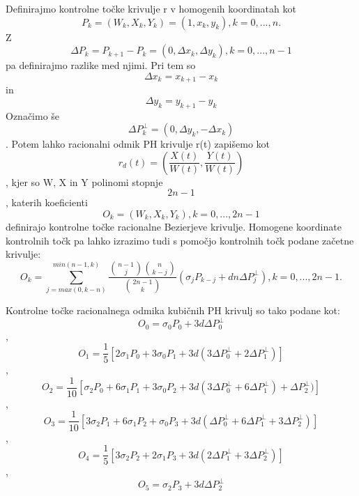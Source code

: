 \documentclass[12pt]{article}
\begin{document}
Definirajmo kontrolne točke krivulje r v homogenih koordinatah kot
$$ P_k = (W_k, X_k, Y_k) = (1, x_k, y_k), k = 0, ..., n.$$
Z $$\Delta P_k = P_{k+1}-P_k = (0, \Delta x_k, \Delta y_k), k = 0, ..., n-1$$ 
pa definirajmo razlike med njimi. Pri tem so $$\Delta x_k = x_{k+1} - x_k$$ in $$\Delta y_k = y_{k+1} - y_k$$
Označimo še $$ \Delta P_k^{\perp} = (0, \Delta y_k, - \Delta x_k)$$. Potem lahko
racionalni odmik PH krivulje r(t) zapišemo kot
$$ r_d(t) = (\frac{X(t)}{W(t)}, \frac{Y(t)}{W(t)})$$,
kjer so W, X in Y polinomi stopnje $$2n -1$$, katerih koeficienti 
$$ O_k = (W_k, X_k, Y_k), k = 0, ..., 2n-1$$
definirajo kontrolne točke racionalne Bezierjeve krivulje. 
Homogene koordinate kontrolnih točk pa lahko izrazimo tudi s pomočjo kontrolnih točk podane začetne krivulje:
$$ O_k = \sum_{j=max(0,k-n)}^{min(n-1,k)}{\frac{\binom{n-1}{j}\binom{n}{k-j}}{\binom{2n-1}{k}}(\sigma_j P_{k-j}+d n \Delta P^{\perp}_{j})}, k = 0, ..., 2n-1.$$

Kontrolne točke racionalnega odmika kubičnih PH krivulj so tako podane kot:
$$ O_0 = \sigma_0 P_0 + 3 d \Delta P_0^{\perp}$$,
$$ O_1 = \frac{1}{5} [2 \sigma_1 P_0 + 3\sigma_0 P_1 + 3 d (3 \Delta P_0^{\perp} + 2 \Delta P_1^{\perp})]$$,
$$ O_2 = \frac{1}{10} [\sigma_2 P_0 + 6\sigma_1 P_1 + 3\sigma_0 P_2 + 3 d (3 \Delta P_0^{\perp} + 6 \Delta P_1^{\perp}) + \Delta P_2^{\perp})]$$,
$$ O_3 = \frac{1}{10} [3\sigma_2 P_1 + 6\sigma_1 P_2 + \sigma_0 P_3 + 3 d (\Delta P_0^{\perp} + 6 \Delta P_1^{\perp} + 3 \Delta P_2^{\perp})]$$,
$$ O_4 = \frac{1}{5} [3\sigma_2 P_2 + 2\sigma_1 P_3 + 3 d (2\Delta P_1^{\perp} + 3 \Delta P_2^{\perp})]$$,
$$ O_5 = \sigma_2 P_3 + 3 d \Delta P_2^{\perp}$$


\end{document}
